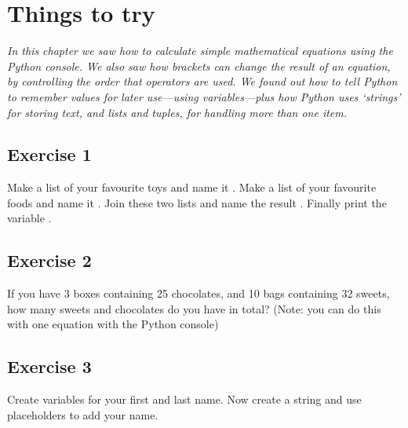 \section{Things to try}

\emph{In this chapter we saw how to calculate simple mathematical equations using the Python console.  We also saw how brackets can change the result of an equation, by controlling the order that operators are used.  We found out how to tell Python to remember values for later use---using variables---plus how Python uses `strings' for storing text, and lists and tuples, for handling more than one item.}
\par

\subsection*{Exercise 1}
Make a list of your favourite toys and name it .  Make a list of your favourite foods and name it .  Join these two lists and name the result .  Finally print the variable .

\subsection*{Exercise 2}
If you have 3 boxes containing 25 chocolates, and 10 bags containing 32 sweets, how many sweets and chocolates do you have in total?  (Note: you can do this with one equation with the Python console)

\subsection*{Exercise 3}
Create variables for your first and last name. Now create a string and use placeholders to add your name.


\newpage

